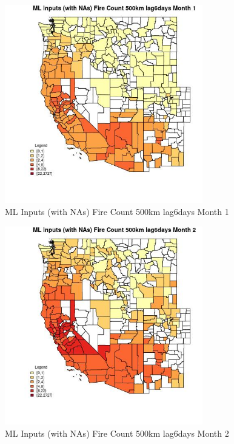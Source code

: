 \begin{figure} 
\centering  
\includegraphics[width=0.77\textwidth]{Code_Outputs/Report_ML_input_PM25_Step4_part_f_de_duplicated_aveswNAs_CountyFire_Count_500km_lag6daysmedianMonth1.jpg} 
\caption{\label{fig:Report_ML_input_PM25_Step4_part_f_de_duplicated_aveswNAsCountyFire_Count_500km_lag6daysmedianMonth1}ML Inputs (with NAs) Fire Count 500km lag6days Month 1} 
\end{figure} 
 

\begin{figure} 
\centering  
\includegraphics[width=0.77\textwidth]{Code_Outputs/Report_ML_input_PM25_Step4_part_f_de_duplicated_aveswNAs_CountyFire_Count_500km_lag6daysmedianMonth2.jpg} 
\caption{\label{fig:Report_ML_input_PM25_Step4_part_f_de_duplicated_aveswNAsCountyFire_Count_500km_lag6daysmedianMonth2}ML Inputs (with NAs) Fire Count 500km lag6days Month 2} 
\end{figure} 
 

